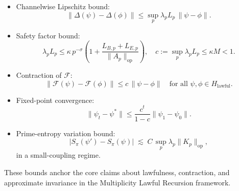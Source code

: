 \documentclass[11pt]{article}
\begin{document}
\begin{itemize}[leftmargin=1.5em]
  \item Channelwise Lipschitz bound:
  \[
    \|\Delta(\psi) - \Delta(\phi)\|
    \le \sup_{p} \lambda_p L_p \, \|\psi - \phi\|.
  \]
  \item Safety factor bound:
  \[
    \lambda_p L_p
    \le \kappa\, p^{-\sigma} \left( 1 + \frac{L_{B,p} + L_{E,p}}{\|A_p\|_{\mathrm{op}}} \right),
    \quad
    c := \sup_p \lambda_p L_p \le \kappa M < 1.
  \]
  \item Contraction of $\mathcal{F}$:
  \[
    \|\mathcal{F}(\psi) - \mathcal{F}(\phi)\| \le c \, \|\psi - \phi\|
    \quad\text{for all } \psi,\phi \in H_{\text{lawful}}.
  \]
  \item Fixed-point convergence:
  \[
    \|\psi_t - \psi^{*}\| \le \frac{c^{t}}{1 - c} \|\psi_1 - \psi_0\|.
  \]
  \item Prime-entropy variation bound:
  \[
    |S_\pi(\psi') - S_\pi(\psi)|
    \;\lesssim\;
    C \, \sup_p \lambda_p \|K_p\|_{\mathrm{op}},
  \]
  in a small-coupling regime.
\end{itemize}

These bounds anchor the core claims about lawfulness, contraction, and approximate invariance in the Multiplicity Lawful Recursion framework.
\nocite{*}
  

\end{document}
